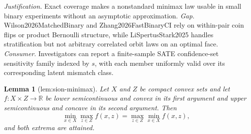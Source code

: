 \documentclass{article}
\newtheorem{lemma}{Lemma}
\begin{document}
\par\smallskip\noindent \textit{Justification.} Exact coverage makes a nonstandard minimax law usable in small binary experiments without an asymptotic approximation. \textit{Gap.} Wilson2026MatchedBinary and Zhang2026FastBinaryCI rely on within-pair coin flips or product Bernoulli structure, while LiSpertusStark2025 handles stratification but not arbitrary correlated orbit laws on an optimal face. \textit{Consumer.} Investigators can report a finite-sample SATE confidence-set sensitivity family indexed by \(s\), with each member uniformly valid over its corresponding latent mismatch class.

\begin{lemma}[lem:sion-minimax]\label{lem:sion-minimax}
Let \(X\) and \(Z\) be compact convex sets and let \(f:X\times Z\to\mathbb R\) be lower semicontinuous and convex in its first argument and upper semicontinuous and concave in its second argument. Then
\[
 \min_{x\in X}\max_{z\in Z}f(x,z)=\max_{z\in Z}\min_{x\in X}f(x,z),
\]
and both extrema are attained.
\end{lemma}
\end{document}
